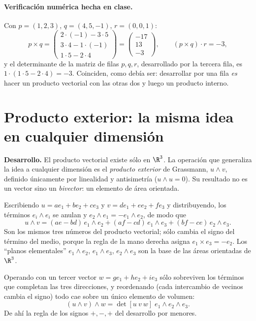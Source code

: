 \paragraph{Verificación numérica hecha en clase.} Con \(p=(1,2,3)\), \(q=(4,5,-1)\),
\(r=(0,0,1)\):
\[
  p\times q=\begin{pmatrix}2\cdot(-1)-3\cdot5\\ 3\cdot4-1\cdot(-1)\\ 1\cdot5-2\cdot4\end{pmatrix}
  =\begin{pmatrix}-17\\13\\-3\end{pmatrix},\qquad
  (p\times q)\cdot r=-3,
\]
y el determinante de la matriz de filas \(p,q,r\), desarrollado por la tercera fila, es
\(1\cdot(1\cdot5-2\cdot4)=-3\). Coinciden, como debía ser: desarrollar por una fila
\emph{es} hacer un producto vectorial con las otras dos y luego un producto interno.

\section{Producto exterior: la misma idea en cualquier dimensión}\label{sec:exterior}

\textbf{Desarrollo.} El producto vectorial existe sólo en \(\R^3\). La operación que
generaliza la idea a cualquier dimensión es el \emph{producto exterior} de Grassmann,
\(u\wedge v\), definido únicamente por linealidad y antisimetría (\(u\wedge u=0\)). Su
resultado no es un vector sino un \emph{bivector}: un elemento de área orientada.

Escribiendo \(u=ae_1+be_2+ce_3\) y \(v=de_1+ee_2+fe_3\) y distribuyendo, los términos
\(e_i\wedge e_i\) se anulan y \(e_2\wedge e_1=-e_1\wedge e_2\), de modo que
\[
  u\wedge v=(ae-bd)\,e_1\wedge e_2+(af-cd)\,e_1\wedge e_3+(bf-ce)\,e_2\wedge e_3 .
\]
Son los mismos tres números del producto vectorial; sólo cambia el signo del término del
medio, porque la regla de la mano derecha asigna \(e_1\times e_3=-e_2\). Los ``planos
elementales'' \(e_1\wedge e_2\), \(e_1\wedge e_3\), \(e_2\wedge e_3\) son la base de las
áreas orientadas de \(\R^3\).

Operando con un tercer vector \(w=ge_1+he_2+ie_3\) sólo sobreviven los términos que completan
las tres direcciones, y reordenando (cada intercambio de vecinos cambia el signo) todo cae
sobre un único elemento de volumen:
\[
  (u\wedge v)\wedge w=\det[u\ v\ w]\;e_1\wedge e_2\wedge e_3 .
\]
De ahí la regla de los signos \(+,-,+\) del desarrollo por menores.

